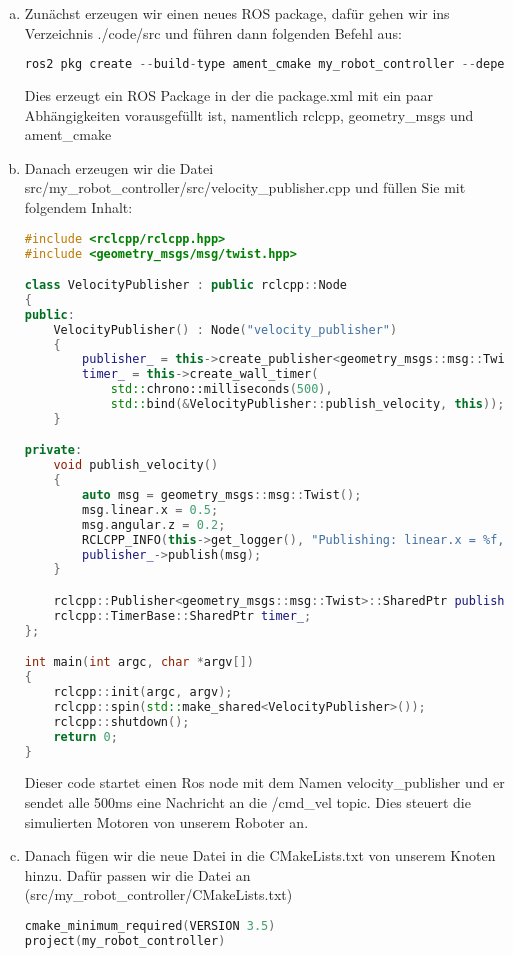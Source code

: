 \documentclass[a4paper,12pt]{article}
\begin{document}
\begin{enumerate}[a)]
\item{
Zunächst erzeugen wir einen neues ROS package, dafür gehen wir ins Verzeichnis ./code/src und führen dann folgenden Befehl aus:
\begin{lstlisting}[language=C++,basicstyle=\fontsize{6.5}{8}\selectfont]
ros2 pkg create --build-type ament_cmake my_robot_controller --dependencies rclcpp geometry_msgs
\end{lstlisting}
}
Dies erzeugt ein ROS Package in der die package.xml mit ein paar Abhängigkeiten vorausgefüllt ist, namentlich rclcpp, geometry\_msgs und ament\_cmake
\item{
Danach erzeugen wir die Datei src/my\_robot\_controller/src/velocity\_publisher.cpp und füllen Sie mit folgendem Inhalt:
\begin{lstlisting}[language=C++,basicstyle=\fontsize{6.5}{8}\selectfont]
#include <rclcpp/rclcpp.hpp>
#include <geometry_msgs/msg/twist.hpp>

class VelocityPublisher : public rclcpp::Node
{
public:
    VelocityPublisher() : Node("velocity_publisher")
    {
        publisher_ = this->create_publisher<geometry_msgs::msg::Twist>("/cmd_vel", 10);
        timer_ = this->create_wall_timer(
            std::chrono::milliseconds(500),
            std::bind(&VelocityPublisher::publish_velocity, this));
    }

private:
    void publish_velocity()
    {
        auto msg = geometry_msgs::msg::Twist();
        msg.linear.x = 0.5;
        msg.angular.z = 0.2;
        RCLCPP_INFO(this->get_logger(), "Publishing: linear.x = %f, angular.z = %f", msg.linear.x, msg.angular.z);
        publisher_->publish(msg);
    }

    rclcpp::Publisher<geometry_msgs::msg::Twist>::SharedPtr publisher_;
    rclcpp::TimerBase::SharedPtr timer_;
};

int main(int argc, char *argv[])
{
    rclcpp::init(argc, argv);
    rclcpp::spin(std::make_shared<VelocityPublisher>());
    rclcpp::shutdown();
    return 0;
}
\end{lstlisting}
Dieser code startet einen Ros node mit dem Namen velocity\_publisher und er sendet alle 500ms eine Nachricht an die /cmd\_vel topic. Dies steuert die simulierten Motoren von unserem Roboter an.
}
\item{
Danach fügen wir die neue Datei in die CMakeLists.txt von unserem Knoten hinzu. Dafür passen wir die Datei an (src/my\_robot\_controller/CMakeLists.txt)
\begin{lstlisting}[language=C++,basicstyle=\fontsize{6.5}{8}\selectfont]
cmake_minimum_required(VERSION 3.5)
project(my_robot_controller)


\end{lstlisting}}
\end{enumerate}
\end{document}
